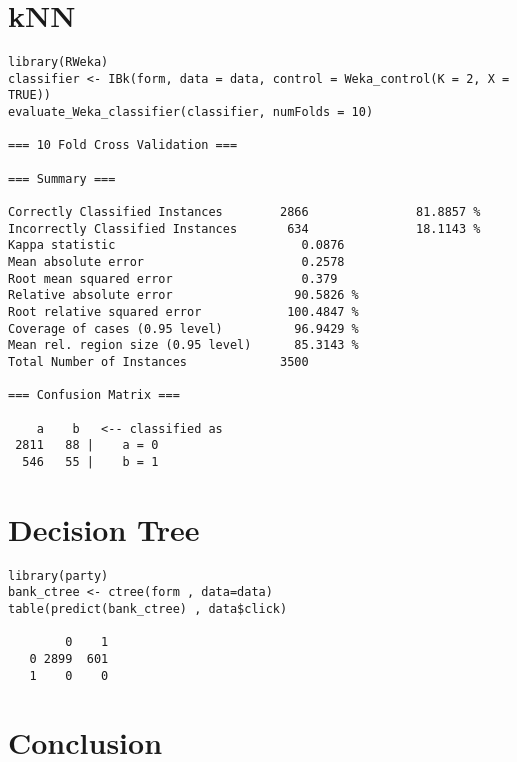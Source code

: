 \documentclass[11pt,a4paper]{article}
\begin{document}
\section{kNN}
\label{sec-4}
\begin{verbatim}
library(RWeka)
classifier <- IBk(form, data = data, control = Weka_control(K = 2, X = TRUE))
evaluate_Weka_classifier(classifier, numFolds = 10)

=== 10 Fold Cross Validation ===

=== Summary ===

Correctly Classified Instances        2866               81.8857 %
Incorrectly Classified Instances       634               18.1143 %
Kappa statistic                          0.0876
Mean absolute error                      0.2578
Root mean squared error                  0.379 
Relative absolute error                 90.5826 %
Root relative squared error            100.4847 %
Coverage of cases (0.95 level)          96.9429 %
Mean rel. region size (0.95 level)      85.3143 %
Total Number of Instances             3500     

=== Confusion Matrix ===

    a    b   <-- classified as
 2811   88 |    a = 0
  546   55 |    b = 1
\end{verbatim}

\section{Decision Tree}
\label{sec-5}
\begin{verbatim}
library(party)
bank_ctree <- ctree(form , data=data)
table(predict(bank_ctree) , data$click)

        0    1
   0 2899  601
   1    0    0
\end{verbatim}

\section{Conclusion}
\label{sec-6}
\end{document}
